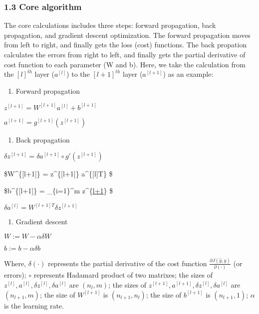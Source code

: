 \documentclass[11pt]{article}
\providecommand{\tightlist}{%
      \setlength{\itemsep}{0pt}\setlength{\parskip}{0pt}}
\begin{document}
\subsubsection{1.3 Core algorithm}\label{core-algorithm}

The core calculations includes three steps: forward propagation, back
propagation, and gradient descent optimization. The forward propagation
moves from left to right, and finally gets the loss (cost) functions.
The back propation calculates the errors from right to left, and finally
gets the partial derivative of cost function to each parameter (W and
b). Here, we take the calculation from the \([l]^{th}\) layer
(\(a^{[l]}\)) to the \([l+1]^{th}\) layer (\(a^{[l+1]}\)) as an example:

\begin{enumerate}
\def\labelenumi{\alph{enumi})}
\tightlist
\item
  Forward propagation
\end{enumerate}

\(z^{[l+1]} = W^{[l+1]} a^{[l]} + b^{[l+1]}\)

\(a^{[l+1]} = g^{[l+1]}(z^{[l+1]})\)

\begin{enumerate}
\def\labelenumi{\alph{enumi})}
\setcounter{enumi}{1}
\tightlist
\item
  Back propagation
\end{enumerate}

\(\delta z^{[l+1]} = \delta a^{[l+1]} \circ g'(z^{[l+1]})\)

\$\delta W\^{}\{{[}l+1{]}\} =  \delta z\^{}\{{[}l+1{]}\}
a\^{}\{{[}l{]}T\} \$

\$\delta b\^{}\{{[}l+1{]}\} =  \sum\_\{i=1\}\^{}m
\delta z\^{}\{\href{i}{l+1}\} \$

\(\delta a^{[l]} = W^{[l+1]T} \delta z^{[l+1]}\)

\begin{enumerate}
\def\labelenumi{\alph{enumi})}
\setcounter{enumi}{2}
\tightlist
\item
  Gradient descent
\end{enumerate}

\(W := W - \alpha \delta W\)

\(b := b - \alpha \delta b\)

Where, \(\delta (\cdot)\) represents the partial derivative of the cost
function \(\frac{\partial J(\hat{y},y)}{\partial (\cdot)}\) (or errors);
\(\circ\) represents Hadamard product of two matrixes; the sizes of
\(z^{[l]}, a^{[l]}, \delta z^{[l]}, \delta a^{[l]}\) are \((n_l, m)\);
the sizes of \(z^{[l+1]}, a^{[l+1]}, \delta z^{[l]}, \delta a^{[l]}\)
are \((n_{l+1}, m)\); the size of \(W^{[l+1]}\) is \((n_{l+1}, n_l)\);
the size of \(b^{[l+1]}\) is \((n_{l+1}, 1)\); \(\alpha\) is the
learning rate.
\end{document}

